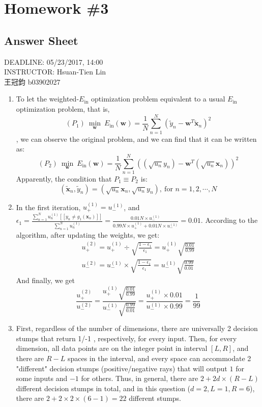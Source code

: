 \documentclass[11pt]{article}
\begin{document}
\section*{Homework \#3}
\subsection*{Answer Sheet}
\begin{center}
DEADLINE: 05/23/2017, 14:00\\
INSTRUCTOR:  Hsuan-Tien Lin\\[0.5cm]
王冠鈞 b03902027
\end{center}


\begin{enumerate}[label=\textbf{\arabic*}.]
	\item To let the weighted-$E_{\text{in}}$ optimization problem equivalent to a usual $E_{\text{in}}$ optimization problem, that is, \[(P_1)\ \underset{\mathbf{w}}\min\ E_{\text{in}}(\mathbf{w}) = \frac{1}{N} \sum_{n=1}^{N} (\tilde{y}_n - \mathbf{w}^T\tilde{\mathbf{x}}_n)^2\], we can observe the original problem, and we can find that it can be written as:\[(P_2)\ \underset{\mathbf{w}}\min\ E_{\text{in}}(\mathbf{w}) = \frac{1}{N} \sum_{n=1}^{N} ((\sqrt{u_n}y_n) - \mathbf{w}^T(\sqrt{u_n}\mathbf{x}_n))^2\] Apparently, the condition that $P_1\equiv P_2$ is:\[(\tilde{\mathbf{x}}_n, \tilde{y}_n)=(\sqrt{u_n}\mathbf{x}_n, \sqrt{u_n}y_n),\ \text{for }n=1, 2, \cdots, N\]

  \item In the first iteration, $u_+^{(1)}=u_-^{(1)}$, and $\epsilon_1 = \frac{\sum_{n=1}^N u_n^{(1)}[\![y_n \neq g_1(\mathbf{x}_n)]\!]}{\sum_{n=1}^{N} u_n^{(1)}} = \frac{0.01N\times u_-^{(1)}}{0.99N\times u_+^{(1)}+0.01N\times u_-^{(1)}}=0.01$. According to the algorithm, after updating the weights, we get:
  \begin{align*}
    u_+^{(2)} = u_+^{(1)}\div\sqrt{\frac{1-\epsilon_1}{\epsilon_1}} = u_+^{(1)}\sqrt{\frac{0.01}{0.99}}\\
    u_-^{(2)} = u_-^{(1)}\times\sqrt{\frac{1-\epsilon_1}{\epsilon_1}} = u_-^{(1)}\sqrt{\frac{0.99}{0.01}}
  \end{align*}
  And finally, we get \[\frac{u_+^{(2)}}{u_-^{(2)}} = \frac{u_+^{(1)}\sqrt{\frac{0.01}{0.99}}}{u_-^{(1)}\sqrt{\frac{0.99}{0.01}}} = \frac{u_+^{(1)}\times0.01}{u_-^{(1)}\times 0.99} = \frac{1}{99}\]

  \item First, regardless of the number of dimensions, there are universally 2 decision stumps that return 1/-1 , respectively, for every input. Then, for every dimension, all data points are on the integer point in interval $[L, R]$, and there are $R-L$ spaces in the interval, and every space can accommodate 2 "different" decision stumps (positive/negative rays) that will output $1$ for some inputs and $-1$ for others. Thus, in general, there are $2 + 2d \times (R - L)$ different decision stumps in total, and in this question ($d=2, L=1, R=6$), there are $2 + 2 \times 2 \times (6 - 1) = 22$ different stumps.


\end{enumerate}
\end{document}
